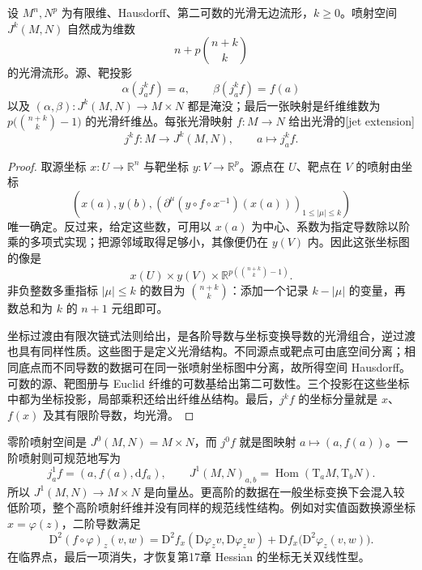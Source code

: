 \begin{proposition}\label{g2:prop:jet-bundle-charts}
	设 \(M^n,N^p\) 为有限维、Hausdorff、第二可数的光滑无边流形，\(k\geq0\)。喷射空间 \(J^k(M,N)\) 自然成为维数
	\[
		n+p\binom{n+k}{k}
	\]
	的光滑流形。源、靶投影
	\[
		\alpha(j_a^k f)=a,\qquad\beta(j_a^k f)=f(a)
	\]
	以及 \((\alpha,\beta):J^k(M,N)\to M\times N\) 都是淹没；最后一张映射是纤维维数为 \(p\bigl(\binom{n+k}{k}-1\bigr)\) 的光滑纤维丛。每张光滑映射 \(f:M\to N\) 给出光滑的[jet extension]
	\[
		j^k f:M\longrightarrow J^k(M,N),\qquad a\longmapsto j_a^k f.
	\]
\end{proposition}
\begin{proof}
	取源坐标 \(x:U\to\mathbb R^n\) 与靶坐标 \(y:V\to\mathbb R^p\)。源点在 \(U\)、靶点在 \(V\) 的喷射由坐标
	\[
		\left(x(a),y(b),\left(\partial^\mu(y\circ f\circ x^{-1})(x(a))\right)_{1\leq|\mu|\leq k}\right)
	\]
	唯一确定。反过来，给定这些数，可用以 \(x(a)\) 为中心、系数为指定导数除以阶乘的多项式实现；把源邻域取得足够小，其像便仍在 \(y(V)\) 内。因此这张坐标图的像是
	\[
		x(U)\times y(V)\times\mathbb R^{p(\binom{n+k}{k}-1)}.
	\]
	非负整数多重指标 \(|\mu|\leq k\) 的数目为 \(\binom{n+k}{k}\)：添加一个记录 \(k-|\mu|\) 的变量，再数总和为 \(k\) 的 \(n+1\) 元组即可。

	坐标过渡由有限次链式法则给出，是各阶导数与坐标变换导数的光滑组合，逆过渡也具有同样性质。这些图于是定义光滑结构。不同源点或靶点可由底空间分离；相同底点而不同导数的数据可在同一张喷射坐标图中分离，故所得空间 Hausdorff。可数的源、靶图册与 Euclid 纤维的可数基给出第二可数性。三个投影在这些坐标中都为坐标投影，局部乘积还给出纤维丛结构。最后，\(j^k f\) 的坐标分量就是 \(x\)、\(f(x)\) 及其有限阶导数，均光滑。
\end{proof}

零阶喷射空间是 \(J^0(M,N)=M\times N\)，而 \(j^0f\) 就是图映射 \(a\mapsto(a,f(a))\)。一阶喷射则可规范地写为
\[
	j_a^1f=(a,f(a),\mathrm d f_a),\qquad
	J^1(M,N)_{a,b}=\operatorname{Hom}(\mathrm T_aM,\mathrm T_bN).
\]
所以 \(J^1(M,N)\to M\times N\) 是向量丛。更高阶的数据在一般坐标变换下会混入较低阶项，整个高阶喷射纤维并没有同样的规范线性结构。例如对实值函数换源坐标 \(x=\varphi(z)\)，二阶导数满足
\[
	\mathrm D^2(f\circ\varphi)_z(v,w)
	=\mathrm D^2f_x(\mathrm D\varphi_zv,\mathrm D\varphi_zw)
	+\mathrm Df_x\bigl(\mathrm D^2\varphi_z(v,w)\bigr).
\]
在临界点，最后一项消失，才恢复第17章 Hessian 的坐标无关双线性型。

